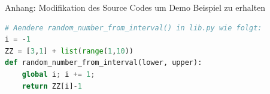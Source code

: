 \begin{frame}[fragile]{Anhang: Modifikation des Source Codes um Demo Beispiel zu erhalten}
  \begin{lstlisting}[language=python]
  # Aendere random_number_from_interval() in lib.py wie folgt:
i = -1
ZZ = [3,1] + list(range(1,10))
def random_number_from_interval(lower, upper):
    global i; i += 1;
    return ZZ[i]-1
  \end{lstlisting}
\logopythonbottom
\end{frame}

